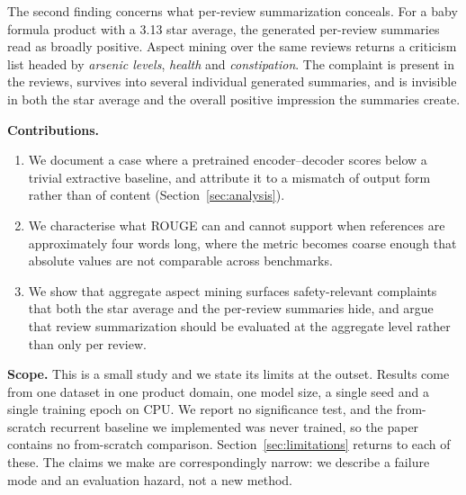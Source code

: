 The second finding concerns what per-review summarization conceals. For a baby
formula product with a 3.13 star average, the generated per-review summaries
read as broadly positive. Aspect mining over the same reviews returns a
criticism list headed by \emph{arsenic levels}, \emph{health} and
\emph{constipation}. The complaint is present in the reviews, survives into
several individual generated summaries, and is invisible in both the star
average and the overall positive impression the summaries create.

\textbf{Contributions.}
\begin{enumerate}
  \item We document a case where a pretrained encoder--decoder scores below a
    trivial extractive baseline, and attribute it to a mismatch of output form
    rather than of content (Section~\ref{sec:analysis}).
  \item We characterise what ROUGE can and cannot support when references are
    approximately four words long, where the metric becomes coarse enough that
    absolute values are not comparable across benchmarks.
  \item We show that aggregate aspect mining surfaces safety-relevant
    complaints that both the star average and the per-review summaries hide,
    and argue that review summarization should be evaluated at the aggregate
    level rather than only per review.
\end{enumerate}

\textbf{Scope.} This is a small study and we state its limits at the outset.
Results come from one dataset in one product domain, one model size, a single
seed and a single training epoch on CPU. We report no significance test, and
the from-scratch recurrent baseline we implemented was never trained, so the
paper contains no from-scratch comparison. Section~\ref{sec:limitations}
returns to each of these. The claims we make are correspondingly narrow: we
describe a failure mode and an evaluation hazard, not a new method.
